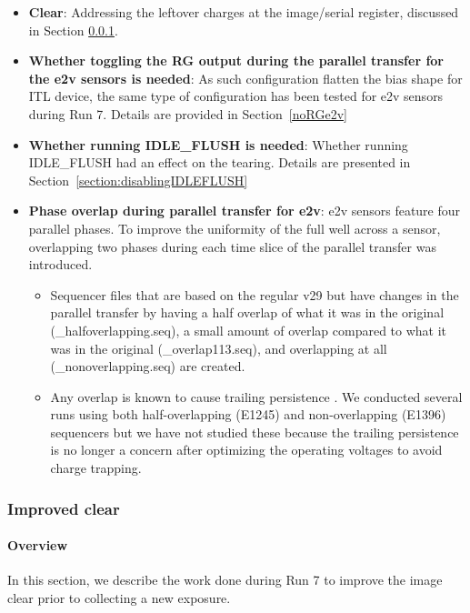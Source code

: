 \begin{itemize}
\item {\bf Clear}: Addressing the leftover charges at the image/serial register, discussed in Section \ref{sec:improved-clear}.
\item {\bf Whether toggling the RG output during the parallel transfer for the e2v sensors is needed}: As such configuration flatten the bias shape for ITL device, the same type of configuration has been tested for e2v sensors during Run 7. Details are provided in Section~\ref{noRGe2v}
\item {\bf Whether running IDLE\_FLUSH is needed}: Whether running IDLE\_FLUSH had an effect on the tearing. Details are presented in Section~\ref{section:disablingIDLEFLUSH}
\item {\bf Phase overlap during parallel transfer for e2v}: e2v sensors feature four parallel phases. To improve the uniformity of the full well across a sensor, overlapping two phases during each time slice of the parallel transfer was introduced.
\begin{itemize}
    \item Sequencer files that are based on the regular v29 but have changes in the parallel transfer by having a half overlap of what it was in the original (\_halfoverlapping.seq), a small amount of overlap compared to what it was in the original (\_overlap113.seq), and overlapping at all (\_nonoverlapping.seq) are created.
    \item Any overlap is known to cause trailing persistence \citep{2025arXiv250205418P}. We conducted several runs using both half-overlapping (E1245) and non-overlapping (E1396) sequencers but we have not studied these because the trailing persistence is no longer a concern after optimizing the operating voltages to avoid charge trapping. 
\end{itemize}


\end{itemize}

\subsubsection{Improved clear}\label{sec:improved-clear}

\paragraph{Overview}\label{overview}

In this section, we describe the work done during Run 7 to improve
the image clear prior to collecting a new exposure.

